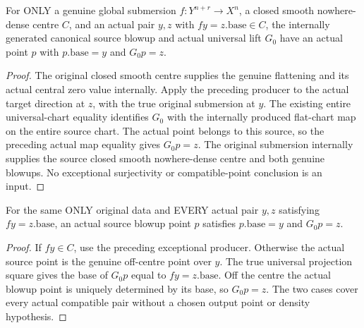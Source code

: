 \begin{theorem}
\label{hir:submersion-blowup-compatible-exceptional-pair}
\leanok
{}
For ONLY a genuine global submersion $f:Y^{n+r}\to X^n$, a closed smooth
nowhere-dense centre $C$, and an actual pair $y,z$ with $fy=z.\mathrm{base}\in C$,
the internally generated canonical source blowup and actual universal lift
$G_0$ have an actual point $p$ with $p.\mathrm{base}=y$ and $G_0p=z$.
\end{theorem}
\begin{proof}
The original closed smooth centre supplies the genuine flattening and its
actual central zero value internally. Apply the preceding producer to the
actual target direction at $z$, with the true original submersion at $y$.
The existing entire universal-chart equality identifies $G_0$ with the
internally produced flat-chart map on the entire source chart. The actual
point belongs to this source, so the preceding actual map equality gives
$G_0p=z$. The original submersion internally supplies the source closed
smooth nowhere-dense centre and both genuine blowups. No exceptional
surjectivity or compatible-point conclusion is an input.
\end{proof}

\begin{theorem}
\label{hir:submersion-blowup-compatible-whole-pair}
\leanok
{}
For the same ONLY original data and EVERY actual pair $y,z$ satisfying
$fy=z.\mathrm{base}$, an actual source blowup point $p$ satisfies
$p.\mathrm{base}=y$ and $G_0p=z$.
\end{theorem}
\begin{proof}
If $fy\in C$, use the preceding exceptional producer. Otherwise the actual
source point is the genuine off-centre point over $y$. The true universal
projection square gives the base of $G_0p$ equal to $fy=z.\mathrm{base}$.
Off the centre the actual blowup point is uniquely determined by its base,
so $G_0p=z$. The two cases cover every actual compatible pair without a
chosen output point or density hypothesis.
\end{proof}

